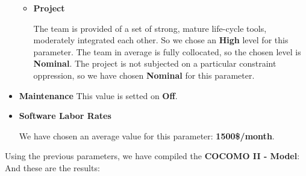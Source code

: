 \begin{itemize}
\begin{itemize}
\begin{itemize}
		\end{itemize}
		\item \textbf{Project}
		\begin{itemize}
			 The team is provided of a set of strong, mature life-cycle tools, moderately integrated each other. So we chose an \textbf{High} level for this parameter.
			 The team in average is fully collocated, so the chosen level is \textbf{Nominal}.
			 The project is not subjected on a particular constraint oppression, so we have chosen \textbf{Nominal} for this parameter.
		\end{itemize}
	\end{itemize}
	\item \textbf{Maintenance} This value is setted on \textbf{Off}.
	\item \textbf{Software Labor Rates}
	\begin{itemize}
		 We have chosen an average value for this parameter: \textbf{1500\$/month}.
	\end{itemize}	
\end{itemize}
Using the previous parameters, we have compiled the \textbf{COCOMO II - Model}:
And these are the results:\\
%